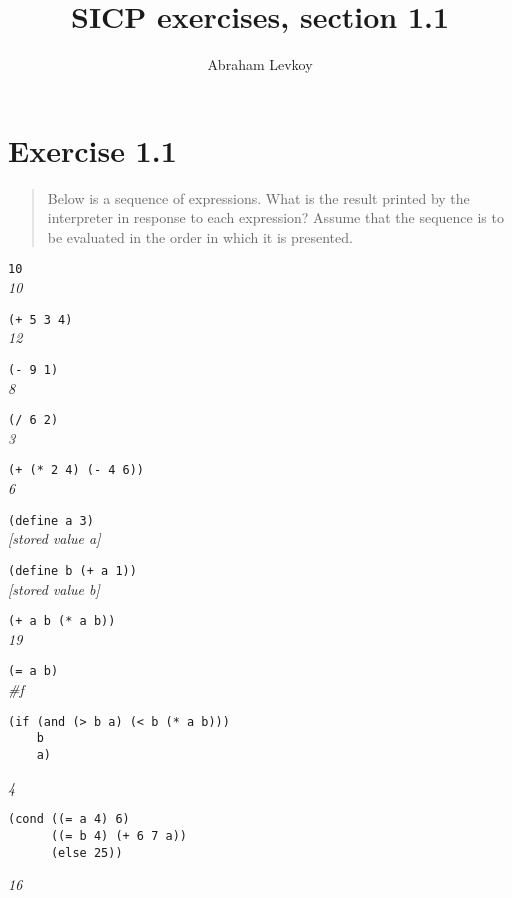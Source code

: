 \documentclass{article}
\author{Abraham Levkoy}
\title{SICP exercises, section 1.1}
\begin{document}
\maketitle


\section{Exercise 1.1}
\begin{quote}
    Below is a sequence of expressions. What is the result printed by the
    interpreter in response to each expression? Assume that the sequence is to
    be evaluated in the order in which it is presented.
\end{quote}

\noindent \lstinline|10| \\
\emph{10}

\noindent \lstinline|(+ 5 3 4)| \\
\emph{12}

\noindent \lstinline|(- 9 1)| \\
\emph{8}

\noindent \lstinline|(/ 6 2)| \\
\emph{3}

\noindent \lstinline|(+ (* 2 4) (- 4 6))| \\
\emph{6}

\noindent \lstinline|(define a 3)| \\
\emph{[stored value a]}

\noindent \lstinline|(define b (+ a 1))| \\
\emph{[stored value b]}

\noindent \lstinline|(+ a b (* a b))| \\
\emph{19}

\noindent \lstinline|(= a b)| \\
\emph{\#f}

\begin{lstlisting}
(if (and (> b a) (< b (* a b)))
    b
    a)
\end{lstlisting}
\emph{4}

\begin{lstlisting}
(cond ((= a 4) 6)
      ((= b 4) (+ 6 7 a))
      (else 25))
\end{lstlisting}
\emph{16}
\end{document}
